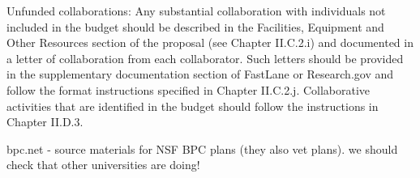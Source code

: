 \iflater
{}

Unfunded collaborations: Any substantial collaboration with
individuals not included in the budget should be described in the
Facilities, Equipment and Other Resources section of the proposal (see
Chapter II.C.2.i) and documented in a letter of collaboration from
each collaborator. Such letters should be provided in the
supplementary documentation section of FastLane or Research.gov and
follow the format instructions specified in Chapter
II.C.2.j. Collaborative activities that are identified in the budget
should follow the instructions in Chapter II.D.3.  

bpc.net - source materials for NSF BPC plans (they also vet plans).
  we should check that other universities are doing!

\fi
